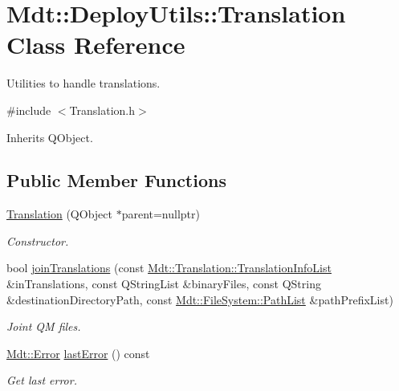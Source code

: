 \hypertarget{class_mdt_1_1_deploy_utils_1_1_translation}{}\section{Mdt\+:\+:Deploy\+Utils\+:\+:Translation Class Reference}
\label{class_mdt_1_1_deploy_utils_1_1_translation}


Utilities to handle translations.  




{\ttfamily \#include $<$Translation.\+h$>$}



Inherits Q\+Object.

\subsection*{Public Member Functions}
\begin{DoxyCompactItemize}
\item 
\hyperlink{class_mdt_1_1_deploy_utils_1_1_translation_a91d20d19af298679124c199a84e60ece}{Translation} (Q\+Object $\ast$parent=nullptr)\hypertarget{class_mdt_1_1_deploy_utils_1_1_translation_a91d20d19af298679124c199a84e60ece}{}\label{class_mdt_1_1_deploy_utils_1_1_translation_a91d20d19af298679124c199a84e60ece}

\begin{DoxyCompactList}\small\item\em Constructor. \end{DoxyCompactList}\item 
bool \hyperlink{class_mdt_1_1_deploy_utils_1_1_translation_ac3498d3c5862cfdc84ef9090618ac2c3}{join\+Translations} (const \hyperlink{class_mdt_1_1_translation_1_1_translation_info_list}{Mdt\+::\+Translation\+::\+Translation\+Info\+List} \&in\+Translations, const Q\+String\+List \&binary\+Files, const Q\+String \&destination\+Directory\+Path, const \hyperlink{class_mdt_1_1_file_system_1_1_path_list}{Mdt\+::\+File\+System\+::\+Path\+List} \&path\+Prefix\+List)
\begin{DoxyCompactList}\small\item\em Joint QM files. \end{DoxyCompactList}\item 
\hyperlink{class_mdt_1_1_error}{Mdt\+::\+Error} \hyperlink{class_mdt_1_1_deploy_utils_1_1_translation_a092129c906151e4b9e2fd435509ecee2}{last\+Error} () const \hypertarget{class_mdt_1_1_deploy_utils_1_1_translation_a092129c906151e4b9e2fd435509ecee2}{}\label{class_mdt_1_1_deploy_utils_1_1_translation_a092129c906151e4b9e2fd435509ecee2}

\begin{DoxyCompactList}\small\item\em Get last error. \end{DoxyCompactList}\end{DoxyCompactItemize}


